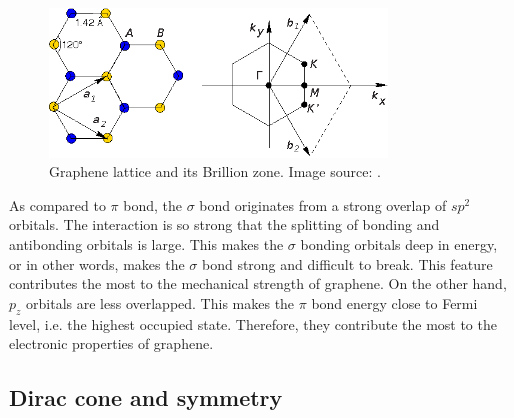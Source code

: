 \begin{figure}[htbp!] 
\centering  
\includegraphics[width=0.8\textwidth]{gra_lat.eps}
\caption{Graphene lattice and its Brillion zone. Image source: \cite{CastroNeto2009}. }  
\label{fig:gra_lat}
\end{figure} 

As compared to $\pi$ bond, the $\sigma$ bond originates from a strong overlap of $sp^2$ orbitals. The interaction is so strong that the splitting of bonding and antibonding orbitals is large. This makes the $\sigma$ bonding orbitals deep in energy, or in other words, makes the $\sigma$ bond strong and difficult to break. This feature contributes the most to the mechanical strength of graphene. On the other hand, $p_z$ orbitals are less overlapped. This makes the $\pi$ bond energy close to Fermi level, i.e. the highest occupied state. Therefore, they contribute the most to the electronic properties of graphene.  


\subsection{Dirac cone and symmetry}

